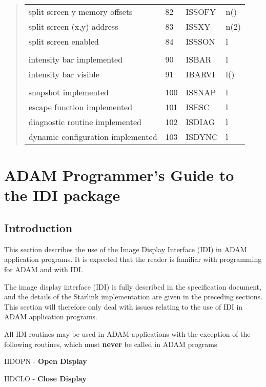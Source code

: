 \begin{quote}
\begin{tabular}{llll}
split screen y memory offsets & 82 & ISSOFY & n() \\
split screen (x,y) address & 83 & ISSXY & n(2) \\
split screen enabled & 84 & ISSSON & l \\
\\
intensity bar implemented & 90 & ISBAR & l \\
intensity bar visible & 91 & IBARVI & l() \\
\\
snapshot implemented & 100 & ISSNAP & l \\
escape function implemented & 101 & ISESC & l \\
diagnostic routine implemented & 102 & ISDIAG & l \\
dynamic configuration implemented & 103 & ISDYNC & l \\
\end{tabular}
\end{quote}

\newpage
\section{ADAM Programmer's Guide to the IDI package}
\label{se:apg}

\subsection{Introduction}

This section describes the use of the Image Display Interface (IDI) in
ADAM application programs. It is expected that the reader is familiar with
programming for ADAM and with IDI.

The image display interface (IDI) is fully described in the specification
document, and the details of the Starlink implementation are given in
the preceding sections. This section will therefore only deal with issues
relating to the use of IDI in ADAM application programs.

All IDI routines may be used in ADAM applications with the exception of
the following routines, which must {\bf never} be called in ADAM programs

\hspace*{20mm}\begin{minipage}{140mm}

\noindent
IIDOPN - {\bf Open Display}

\noindent
IIDCLO - {\bf Close Display}

\end{minipage}

